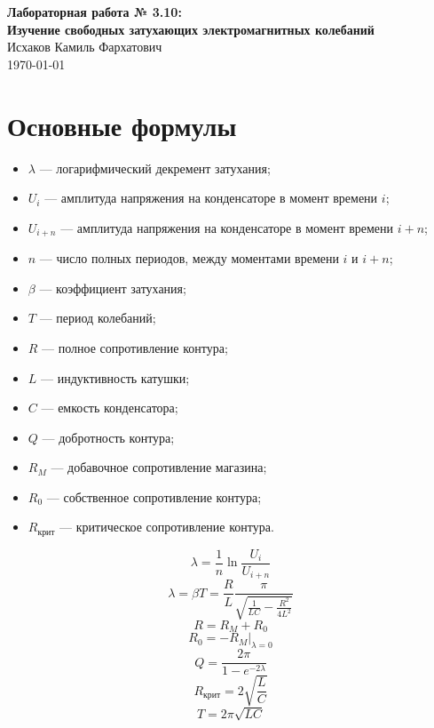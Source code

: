 \documentclass{article}%
\begin{document}
%
\normalsize%
\begin{center}%
\vspace*{\fill}%
{\LARGE\textbf{Лабораторная работа № 3.10: \\ Изучение свободных затухающих электромагнитных колебаний}}\\[1cm]%
{\Large Исхаков Камиль Фархатович}\\[1cm]%
{\Large \today}%
\vspace*{\fill}%
\end{center}%
\newpage%
\section{Основные формулы}%
\label{sec:}%
\begin{itemize}    \item $\lambda$ --- логарифмический декремент затухания;    \item $U_i$ --- амплитуда напряжения на конденсаторе в момент времени $i$;    \item $U_{i+n}$ --- амплитуда напряжения на конденсаторе в момент времени $i+n$;    \item $n$ --- число полных периодов, между моментами времени $i$ и $i+n$;    \item $\beta$ --- коэффициент затухания;    \item $T$ --- период колебаний;    \item $R$ --- полное сопротивление контура;    \item $L$ --- индуктивность катушки;    \item $C$ --- емкость конденсатора;    \item $Q$ --- добротность контура;    \item $R_M$ --- добавочное сопротивление магазина;    \item $R_0$ --- собственное сопротивление контура;    \item $R_{\text{крит}}$ --- критическое сопротивление контура.\end{itemize}\begin{equation*}    \lambda = \frac{1}{n}\ln{\frac{U_i}{U_{i+n}}}\end{equation*} \begin{equation*}    \lambda = \beta T = \frac{R}{L}\frac{\pi}{\sqrt{\frac{1}{LC} - \frac{R^2}{4L^2}}}\end{equation*} \begin{equation*}    R = R_M + R_0\end{equation*} \begin{equation*}    R_0 = -R_M|_{\lambda = 0}\end{equation*} \begin{equation*}    Q = \frac{2\pi}{1 - e^{-2\lambda}}\end{equation*} \begin{equation*}    R_{\text{крит}} = 2\sqrt{\frac{L}{C}}\end{equation*} \begin{equation*}    T = 2\pi\sqrt{LC}\end{equation*}%
\end{document}
